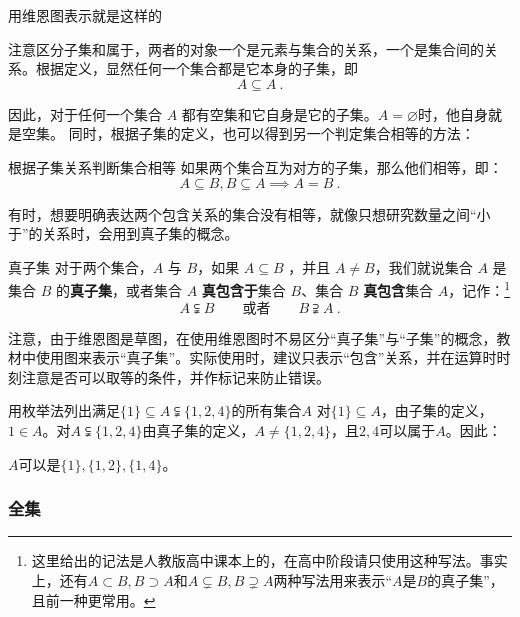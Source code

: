 用维恩图表示就是这样的

注意区分子集和属于，两者的对象一个是元素与集合的关系，一个是集合间的关系。根据定义，显然任何一个集合都是它本身的子集，即
\begin{equation}
A \subseteq A~.
\end{equation}

因此，对于任何一个集合 $A$ 都有空集和它自身是它的子集。$A=\varnothing$时，他自身就是空集。
同时，根据子集的定义，也可以得到另一个判定集合相等的方法：

\begin{theorem}{根据子集关系判断集合相等}
如果两个集合互为对方的子集，那么他们相等，即：
\begin{equation}\label{eq_HsSet_1}
A\subseteq B,B\subseteq A\implies A=B~.
\end{equation}
\end{theorem}

有时，想要明确表达两个包含关系的集合没有相等，就像只想研究数量之间“小于”的关系时，会用到真子集的概念。

\begin{definition}{真子集}
对于两个集合，$A$ 与 $B$，如果 $A\subseteq B$ ，并且 $A \ne B$，我们就说集合 $A$ 是集合 $B$ 的\textbf{真子集}，或者集合 $A$ \textbf{真包含于}集合 $B$、集合 $B$ \textbf{真包含}集合 $A$，记作：\footnote{这里给出的记法是人教版高中课本上的，在高中阶段请只使用这种写法。事实上，还有$A\subset B,B\supset A$和$A\subsetneq B,B\supsetneq A$两种写法用来表示“$A$是$B$的真子集”，且前一种更常用。}
\begin{equation}
A \subsetneqq B\qquad\text{或者}\qquad B \supsetneqq A~.
\end{equation}
\end{definition}

注意，由于维恩图是草图，在使用维恩图时不易区分“真子集”与“子集”的概念，教材中使用图来表示“真子集”。实际使用时，建议只表示“包含”关系，并在运算时时刻注意是否可以取等的条件，并作标记来防止错误。

\begin{exercise}{用枚举法列出满足$\{1\}\subseteq A\subsetneqq\{1,2,4\}$的所有集合$A$}
对$\{1\}\subseteq A$，由子集的定义，$1\in A$。对$A\subsetneqq\{1,2,4\}$由真子集的定义，$A\neq \{1,2,4\}$，且$2,4$可以属于$A$。因此：

$A$可以是$\{1\},\{1,2\},\{1,4\}$。
\end{exercise}
\subsubsection{全集}

